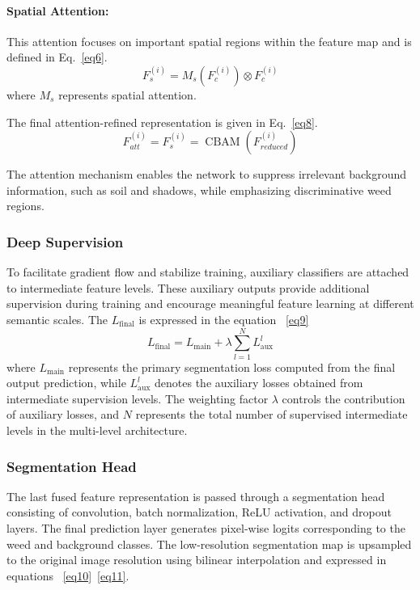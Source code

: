 \documentclass[pdflatex,sn-mathphys-num]{sn-jnl}
\begin{document}
\paragraph{Spatial Attention:}
This attention focuses on important spatial regions within
the feature map and is defined in Eq.~\ref{eq6}.
\begin{equation}
F_{s}^{(i)} = M_s(F_c^{(i)}) \otimes F_c^{(i)}
\label{eq6}
\end{equation}
where $M_s$ represents spatial attention.

The final attention-refined representation is given
in Eq.~\ref{eq8}.
\begin{equation}
F_{att}^{(i)} = F_s^{(i)}
= \operatorname{CBAM}(F_{reduced}^{(i)})
\label{eq8}
\end{equation}

The attention mechanism enables the network to suppress
irrelevant background information, such as soil and shadows,
while emphasizing discriminative weed regions.

\subsubsection{Deep Supervision}
To facilitate gradient flow and stabilize training, auxiliary classifiers are attached to intermediate feature levels. These auxiliary outputs provide additional supervision during training and encourage meaningful feature learning at different semantic scales. The $L_{\text{final}}$ is expressed in the equation ~\ref{eq9}
\begin{equation}
L_{\text{final}} = L_{\text{main}} + \lambda \sum_{l=1}^{N} L_{\text{aux}}^{l}\label{eq9}
\end{equation}
where \(L_{\text{main}}\) represents the primary segmentation loss computed from the final output prediction, while \(L_{\text{aux}}^{l}\) denotes the auxiliary losses obtained from intermediate supervision levels. The weighting factor \(\lambda\) controls the contribution of auxiliary losses, and \(N\) represents the total number of supervised intermediate levels in the multi-level architecture.
\subsubsection{Segmentation Head}
The last fused feature representation is passed through a segmentation head consisting of convolution, batch normalization, ReLU activation, and dropout layers. The final prediction layer generates pixel-wise logits corresponding to the weed and background classes. 
The low-resolution segmentation map is upsampled to the original image resolution using bilinear interpolation and expressed in equations ~\ref{eq10}~\ref{eq11}.
\end{document}
